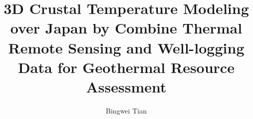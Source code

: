 \title{3D Crustal Temperature Modeling over Japan by Combine Thermal Remote Sensing and Well-logging Data for Geothermal Resource Assessment}


\author{Bingwei Tian}








